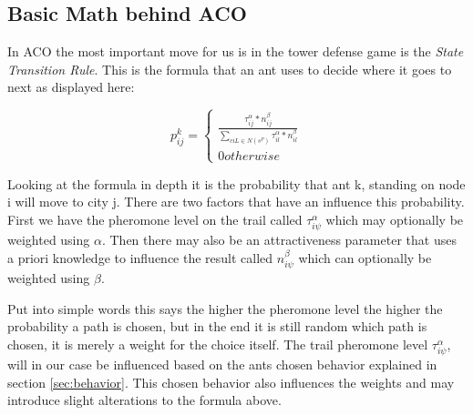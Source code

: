 \subsection{Basic Math behind ACO}

In ACO the most important move for us is in the tower defense game is the \textit{State Transition Rule}. This is the formula that an ant uses to decide where it goes to next as displayed here\cite{dorigo2006ant}:

\begin{equation}
p^k_{ij}=
\begin{cases}
\frac{\tau^\alpha_{ij}*n^\beta_{ij}}{\sum_{ciL\in N(s^P)}\tau^\alpha_{il}*n^\beta_{il}} \\
0 otherwise
\end{cases}
\end{equation}

Looking at the formula in depth it is the probability that ant k, standing on node i will move to city j\cite{maniezzo2002ant}.
There are two factors that have an influence this probability.
First we have the pheromone level on the trail called $\tau^\alpha_{i\psi}$ which may optionally be weighted using $\alpha$.
Then there may also be an attractiveness parameter that uses a priori knowledge to influence the result called $n^\beta_{i\psi}$ which can optionally be weighted using $\beta$\cite{dorigo2006ant}.

Put into simple words this says the higher the pheromone level the higher the probability a path is chosen, but in the end it is still random which path is chosen, it is merely a weight for the choice itself.
The trail pheromone level $\tau^\alpha_{i\psi}$, will in our case be influenced based on the ants chosen behavior explained in section \ref{sec:behavior}. This chosen behavior also influences the weights and may introduce slight alterations to the formula above.